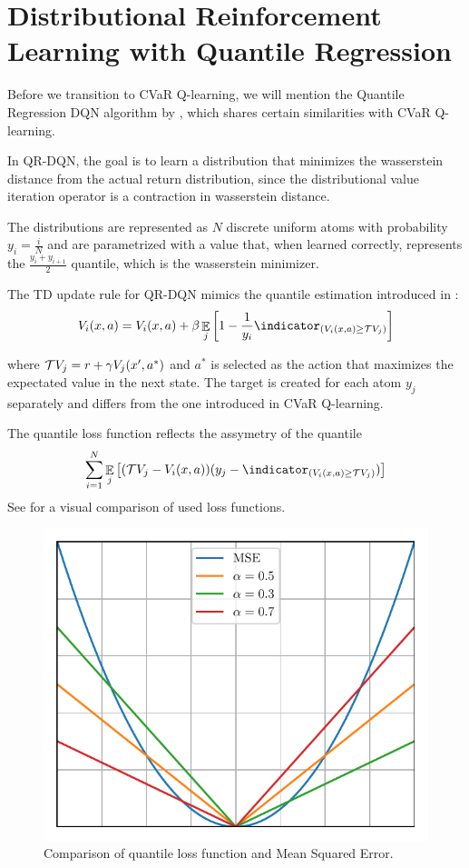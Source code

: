 \section{Distributional Reinforcement Learning with Quantile Regression}
Before we transition to CVaR Q-learning, we will mention the Quantile Regression DQN algorithm by \citet{dabney2017distributional}, which shares certain similarities with CVaR Q-learning.

In QR-DQN, the goal is to learn a distribution that minimizes the wasserstein distance from the actual return distribution, since the distributional value iteration operator is a contraction in wasserstein distance. 

The distributions are represented as $N$ discrete uniform atoms with probability $y_i = \frac{i}{N}$ and are parametrized with a value that, when learned correctly, represents the $\frac{y_{i}+y_{i+1}}{2}$ quantile, which is the wasserstein minimizer.

The TD update rule for QR-DQN mimics the quantile estimation introduced in :
\begin{equation*}
V_i(x, a) = V_i(x, a) + \beta \expect_j\bsquare{1-\dfrac{1}{y_i}\indicator_{(V_i(x, a) \ge \cT V_j)}}
\end{equation*}

where $\mathcal{T} V_j = r + \gamma V_j(x', a^*)$ and $a^*$ is selected as the action that maximizes the expectated value in the next state. The target is created for each atom $y_j$ separately and differs from the one introduced in CVaR Q-learning.

The quantile loss function reflects the assymetry of the quantile
\begin{equation}
\sum_{i=1}^{N} \expect_j\bsquare{(\cT V_j - V_i(x, a))(y_j - \indicator_{(V_i(x, a) \ge \cT V_j)})}
\end{equation}
See  for a visual comparison of used loss functions.


\begin{figure}[h]
\center
\includegraphics[width=0.6\linewidth]{gfx/losses.pdf}
\caption{Comparison of quantile loss function and Mean Squared Error.}
\label{fig:losses}
\end{figure}

